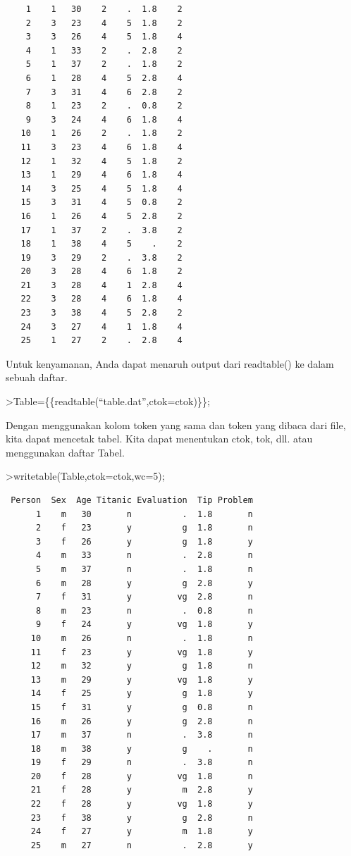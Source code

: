 \documentclass[
]{book}
\begin{document}
\begin{verbatim}
    1    1   30    2    .  1.8    2
    2    3   23    4    5  1.8    2
    3    3   26    4    5  1.8    4
    4    1   33    2    .  2.8    2
    5    1   37    2    .  1.8    2
    6    1   28    4    5  2.8    4
    7    3   31    4    6  2.8    2
    8    1   23    2    .  0.8    2
    9    3   24    4    6  1.8    4
   10    1   26    2    .  1.8    2
   11    3   23    4    6  1.8    4
   12    1   32    4    5  1.8    2
   13    1   29    4    6  1.8    4
   14    3   25    4    5  1.8    4
   15    3   31    4    5  0.8    2
   16    1   26    4    5  2.8    2
   17    1   37    2    .  3.8    2
   18    1   38    4    5    .    2
   19    3   29    2    .  3.8    2
   20    3   28    4    6  1.8    2
   21    3   28    4    1  2.8    4
   22    3   28    4    6  1.8    4
   23    3   38    4    5  2.8    2
   24    3   27    4    1  1.8    4
   25    1   27    2    .  2.8    4
\end{verbatim}

Untuk kenyamanan, Anda dapat menaruh output dari readtable() ke dalam sebuah daftar.

\textgreater Table=\{\{readtable(``table.dat'',ctok=ctok)\}\};

Dengan menggunakan kolom token yang sama dan token yang dibaca dari file, kita dapat mencetak tabel. Kita dapat menentukan ctok, tok, dll. atau menggunakan daftar Tabel.

\textgreater writetable(Table,ctok=ctok,wc=5);

\begin{verbatim}
 Person  Sex  Age Titanic Evaluation  Tip Problem
      1    m   30       n          .  1.8       n
      2    f   23       y          g  1.8       n
      3    f   26       y          g  1.8       y
      4    m   33       n          .  2.8       n
      5    m   37       n          .  1.8       n
      6    m   28       y          g  2.8       y
      7    f   31       y         vg  2.8       n
      8    m   23       n          .  0.8       n
      9    f   24       y         vg  1.8       y
     10    m   26       n          .  1.8       n
     11    f   23       y         vg  1.8       y
     12    m   32       y          g  1.8       n
     13    m   29       y         vg  1.8       y
     14    f   25       y          g  1.8       y
     15    f   31       y          g  0.8       n
     16    m   26       y          g  2.8       n
     17    m   37       n          .  3.8       n
     18    m   38       y          g    .       n
     19    f   29       n          .  3.8       n
     20    f   28       y         vg  1.8       n
     21    f   28       y          m  2.8       y
     22    f   28       y         vg  1.8       y
     23    f   38       y          g  2.8       n
     24    f   27       y          m  1.8       y
     25    m   27       n          .  2.8       y
\end{verbatim}
\end{document}
